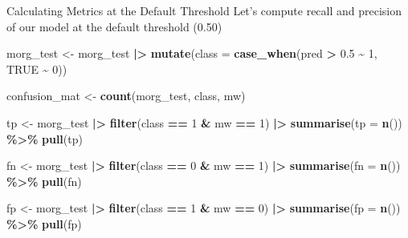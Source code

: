 \documentclass[
  ignorenonframetext,
]{beamer}
\newenvironment{Shaded}{\begin{snugshade}}{\end{snugshade}}
\newcommand{\AttributeTok}[1]{\textcolor[rgb]{0.13,0.29,0.53}{#1}}
\newcommand{\ConstantTok}[1]{\textcolor[rgb]{0.56,0.35,0.01}{#1}}
\newcommand{\DecValTok}[1]{\textcolor[rgb]{0.00,0.00,0.81}{#1}}
\newcommand{\FloatTok}[1]{\textcolor[rgb]{0.00,0.00,0.81}{#1}}
\newcommand{\FunctionTok}[1]{\textcolor[rgb]{0.13,0.29,0.53}{\textbf{#1}}}
\newcommand{\NormalTok}[1]{#1}
\newcommand{\OtherTok}[1]{\textcolor[rgb]{0.56,0.35,0.01}{#1}}
\newcommand{\SpecialCharTok}[1]{\textcolor[rgb]{0.81,0.36,0.00}{\textbf{#1}}}
\begin{document}
\begin{frame}[fragile]{Calculating Metrics at the Default Threshold}
\label{calculating-metrics-at-the-default-threshold}
Let's compute recall and precision of our model at the default threshold
(0.50)

\tiny

\begin{Shaded}
\begin{Highlighting}[]
\NormalTok{morg\_test }\OtherTok{\textless{}{-}}\NormalTok{ morg\_test }\SpecialCharTok{|\textgreater{}}
  \FunctionTok{mutate}\NormalTok{(}\AttributeTok{class =} \FunctionTok{case\_when}\NormalTok{(pred }\SpecialCharTok{\textgreater{}} \FloatTok{0.5} \SpecialCharTok{\textasciitilde{}} \DecValTok{1}\NormalTok{,}
                           \ConstantTok{TRUE} \SpecialCharTok{\textasciitilde{}} \DecValTok{0}\NormalTok{))}

\NormalTok{confusion\_mat }\OtherTok{\textless{}{-}} \FunctionTok{count}\NormalTok{(morg\_test, class, mw)}

\NormalTok{tp }\OtherTok{\textless{}{-}}\NormalTok{ morg\_test }\SpecialCharTok{|\textgreater{}}
  \FunctionTok{filter}\NormalTok{(class }\SpecialCharTok{==} \DecValTok{1} \SpecialCharTok{\&}\NormalTok{ mw }\SpecialCharTok{==} \DecValTok{1}\NormalTok{) }\SpecialCharTok{|\textgreater{}}
  \FunctionTok{summarise}\NormalTok{(}\AttributeTok{tp =} \FunctionTok{n}\NormalTok{()) }\SpecialCharTok{\%\textgreater{}\%}
  \FunctionTok{pull}\NormalTok{(tp)}

\NormalTok{fn }\OtherTok{\textless{}{-}}\NormalTok{ morg\_test }\SpecialCharTok{|\textgreater{}}
  \FunctionTok{filter}\NormalTok{(class }\SpecialCharTok{==} \DecValTok{0} \SpecialCharTok{\&}\NormalTok{ mw }\SpecialCharTok{==} \DecValTok{1}\NormalTok{) }\SpecialCharTok{|\textgreater{}}
  \FunctionTok{summarise}\NormalTok{(}\AttributeTok{fn =} \FunctionTok{n}\NormalTok{()) }\SpecialCharTok{\%\textgreater{}\%}
  \FunctionTok{pull}\NormalTok{(fn)}

\NormalTok{fp }\OtherTok{\textless{}{-}}\NormalTok{ morg\_test }\SpecialCharTok{|\textgreater{}}
  \FunctionTok{filter}\NormalTok{(class }\SpecialCharTok{==} \DecValTok{1} \SpecialCharTok{\&}\NormalTok{ mw }\SpecialCharTok{==} \DecValTok{0}\NormalTok{) }\SpecialCharTok{|\textgreater{}}
  \FunctionTok{summarise}\NormalTok{(}\AttributeTok{fp =} \FunctionTok{n}\NormalTok{()) }\SpecialCharTok{\%\textgreater{}\%}
  \FunctionTok{pull}\NormalTok{(fp)}
\end{Highlighting}
\end{Shaded}
\end{frame}
\end{document}
